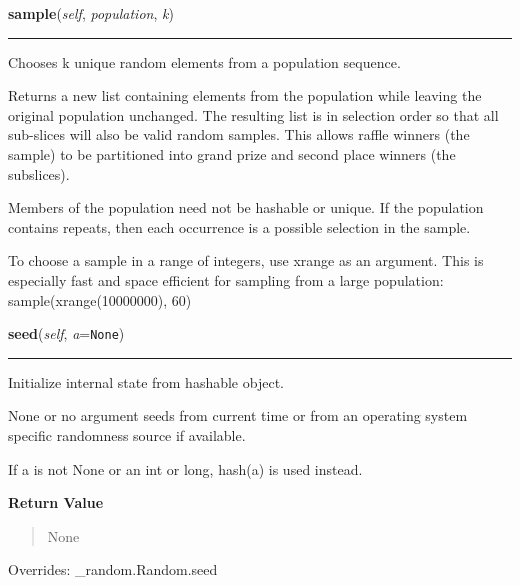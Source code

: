 \hspace{.8\funcindent}\begin{boxedminipage}{\funcwidth}

    \raggedright \textbf{sample}(\textit{self}, \textit{population}, \textit{k})

    \vspace{-1.5ex}

    \rule{\textwidth}{0.5\fboxrule}
\setlength{\parskip}{2ex}
    Chooses k unique random elements from a population sequence.

    Returns a new list containing elements from the population while 
    leaving the original population unchanged.  The resulting list is in 
    selection order so that all sub-slices will also be valid random 
    samples.  This allows raffle winners (the sample) to be partitioned 
    into grand prize and second place winners (the subslices).

    Members of the population need not be hashable or unique.  If the 
    population contains repeats, then each occurrence is a possible 
    selection in the sample.

    To choose a sample in a range of integers, use xrange as an argument. 
    This is especially fast and space efficient for sampling from a large 
    population:   sample(xrange(10000000), 60)

\setlength{\parskip}{1ex}
    \end{boxedminipage}

    \vspace{0.5ex}

\hspace{.8\funcindent}\begin{boxedminipage}{\funcwidth}

    \raggedright \textbf{seed}(\textit{self}, \textit{a}={\tt None})

    \vspace{-1.5ex}

    \rule{\textwidth}{0.5\fboxrule}
\setlength{\parskip}{2ex}
    Initialize internal state from hashable object.

    None or no argument seeds from current time or from an operating system
    specific randomness source if available.

    If a is not None or an int or long, hash(a) is used instead.

\setlength{\parskip}{1ex}
      \textbf{Return Value}
    \vspace{-1ex}

      \begin{quote}
      None

      \end{quote}

      Overrides: \_random.Random.seed

    \end{boxedminipage}

